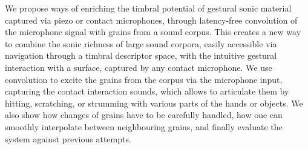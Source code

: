 We propose ways of enriching the timbral potential of gestural sonic material captured via piezo or contact microphones, through latency-free convolution of the microphone signal with grains from a sound corpus.
%
This creates a new way to combine the sonic richness of large sound corpora, easily accessible via navigation through a timbral descriptor space, with the intuitive gestural interaction with a surface, captured by any contact microphone.
%
We use convolution to excite the grains from the corpus via the microphone input, capturing the contact interaction sounds, which allows to articulate them by hitting, scratching, or strumming with various parts of the hands or objects.
%
We also show how changes of grains have to be carefully handled, how one can smoothly interpolate between neighbouring grains, and finally evaluate the system against previous attempts.
